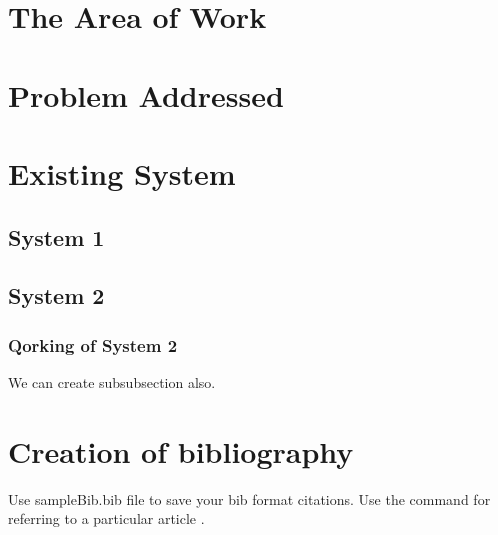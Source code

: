 \section{The Area of Work}
 
\blindtext


\section{Problem Addressed}
\blindtext

\section{Existing System}
\blindtext

\subsection{ System 1}
\blindtext

 \subsection{System 2}
 \subsubsection{Qorking of System 2}
 We can create subsubsection also. 
\section{Creation of bibliography}
Use sampleBib.bib file to save your bib format citations. Use the command \cite{saini2010alternative} for referring to a particular article \cite{imre2006majority}. 






